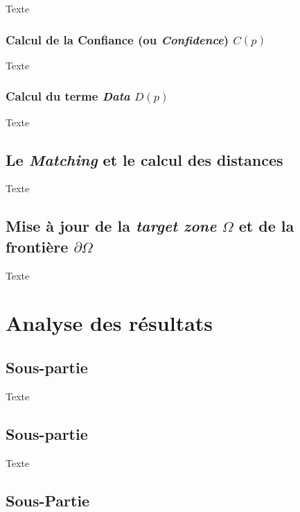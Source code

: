 \documentclass[12pt]{article}
\begin{document}
Texte

\subsubsection{Calcul de la Confiance (ou \textit{Confidence}) $C(p)$}

Texte

\subsubsection{Calcul du terme \textit{Data} $D(p)$}

Texte

\subsection{Le \textit{Matching} et le calcul des distances}

Texte


\subsection{Mise à jour de la \textit{target zone} $\Omega$ et de la frontière $\partial\Omega$}

Texte


\newpage
\section{Analyse des résultats}

\subsection{Sous-partie}

Texte

\subsection{Sous-partie}

Texte


\subsection{Sous-Partie}
\end{document}
